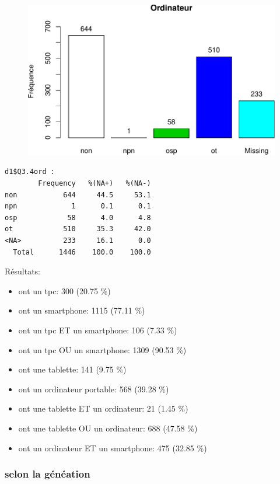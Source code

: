 \documentclass[]{article}
\begin{document}
\begin{figure}[htbp]
\centering
\includegraphics{qs_etudiants_files/figure-latex/outils-4.pdf}
\end{figure}

\begin{verbatim}
d1$Q3.4ord : 
        Frequency   %(NA+)   %(NA-)
non           644     44.5     53.1
npn             1      0.1      0.1
osp            58      4.0      4.8
ot            510     35.3     42.0
<NA>          233     16.1      0.0
  Total      1446    100.0    100.0
\end{verbatim}

Résultats:

\begin{itemize}
\item
  ont un tpc: 300 (20.75 \%)
\item
  ont un smartphone: 1115 (77.11 \%)
\item
  ont un tpc ET un smartphone: 106 (7.33 \%)
\item
  ont un tpc OU un smartphone: 1309 (90.53 \%)
\item
  ont une tablette: 141 (9.75 \%)
\item
  ont un ordinateur portable: 568 (39.28 \%)
\item
  ont une tablette ET un ordinateur: 21 (1.45 \%)
\item
  ont une tablette OU un ordinateur: 688 (47.58 \%)
\item
  ont un ordinateur ET un smartphone: 475 (32.85 \%)
\end{itemize}

\subsubsection{selon la généation}\label{selon-la-geneation}
\end{document}
